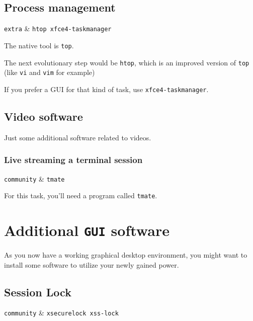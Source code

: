 \documentclass[10pt]{dustdoc}
\begin{document}
\subsection{Process management}
\label{sec:process-management}

\begin{packagetable}
    \texttt{extra} & \texttt{htop xfce4-taskmanager} \\
\end{packagetable}

The native tool is \texttt{top}.

The next evolutionary step would be \texttt{htop}, which is an improved version of \texttt{top} (like \texttt{vi} and \texttt{vim} for example)

If you prefer a GUI for that kind of task, use \texttt{xfce4-taskmanager}.

\subsection{Video software}
\label{sec:console-video-software}

Just some additional software related to videos.

\subsubsection{Live streaming a terminal session}
\label{sec:live-streaming-a-terminal-session}

\begin{packagetable}
    \texttt{community} & \texttt{tmate} \\
\end{packagetable}

For this task, you’ll need a program called \texttt{tmate}.

\section{Additional \texttt{GUI} software}
\label{sec:additional-gui-software}

As you now have a working graphical desktop environment, you might want to install some software to utilize your newly gained power.

\subsection{Session Lock}
\label{sec:session-lock}

\begin{packagetable}
    \texttt{community} & \texttt{xsecurelock xss-lock} \\
\end{packagetable}
\end{document}

